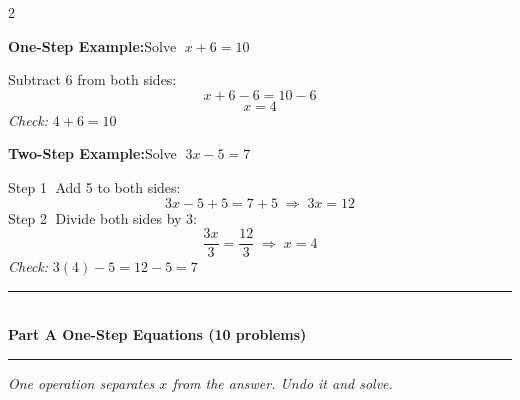 \documentclass[12pt]{article}
\newcommand{\sectionbar}[1]{%
  \vspace{8pt}
  \noindent\rule{\textwidth}{0.8pt}\\[2pt]
  {\large\bfseries #1}\\[-4pt]
  \rule{\textwidth}{0.8pt}
  \vspace{4pt}
}
\begin{document}
\begin{multicols}{2}

\noindent\textbf{One-Step Example:}\quad Solve $\;x + 6 = 10$

\vspace{4pt}
\noindent Subtract 6 from both sides:
\[
  x + 6 - 6 = 10 - 6
\]
\[
  \boxed{x = 4}
\]
\noindent\textit{Check:} $4 + 6 = 10$ \checkmark

\columnbreak

\noindent\textbf{Two-Step Example:}\quad Solve $\;3x - 5 = 7$

\vspace{4pt}
\noindent Step \textcircled{1} Add 5 to both sides:
\[
  3x - 5 + 5 = 7 + 5 \;\Rightarrow\; 3x = 12
\]
\noindent Step \textcircled{2} Divide both sides by 3:
\[
  \frac{3x}{3} = \frac{12}{3} \;\Rightarrow\; \boxed{x = 4}
\]
\noindent\textit{Check:} $3(4)-5 = 12-5 = 7$ \checkmark

\end{multicols}

\vspace{4pt}

\sectionbar{Part A \quad One-Step Equations \hfill{\normalfont\normalsize (10 problems)}}

\noindent\textit{One operation separates $x$ from the answer. Undo it and solve.}
\end{document}
